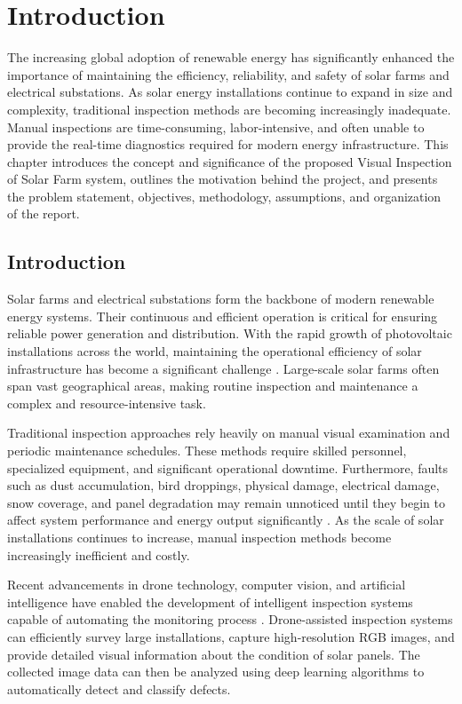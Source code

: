 \chapter{Introduction}

The increasing global adoption of renewable energy has significantly enhanced the importance of maintaining the efficiency, reliability, and safety of solar farms and electrical substations. As solar energy installations continue to expand in size and complexity, traditional inspection methods are becoming increasingly inadequate. Manual inspections are time-consuming, labor-intensive, and often unable to provide the real-time diagnostics required for modern energy infrastructure. This chapter introduces the concept and significance of the proposed Visual Inspection of Solar Farm system, outlines the motivation behind the project, and presents the problem statement, objectives, methodology, assumptions, and organization of the report.

\section{Introduction}

Solar farms and electrical substations form the backbone of modern renewable energy systems. Their continuous and efficient operation is critical for ensuring reliable power generation and distribution. With the rapid growth of photovoltaic installations across the world, maintaining the operational efficiency of solar infrastructure has become a significant challenge \cite{ref1,ref2}. Large-scale solar farms often span vast geographical areas, making routine inspection and maintenance a complex and resource-intensive task.

Traditional inspection approaches rely heavily on manual visual examination and periodic maintenance schedules. These methods require skilled personnel, specialized equipment, and significant operational downtime. Furthermore, faults such as dust accumulation, bird droppings, physical damage, electrical damage, snow coverage, and panel degradation may remain unnoticed until they begin to affect system performance and energy output significantly \cite{ref3,ref4}. As the scale of solar installations continues to increase, manual inspection methods become increasingly inefficient and costly.

Recent advancements in drone technology, computer vision, and artificial intelligence have enabled the development of intelligent inspection systems capable of automating the monitoring process \cite{ref5,ref6,ref7}. Drone-assisted inspection systems can efficiently survey large installations, capture high-resolution RGB images, and provide detailed visual information about the condition of solar panels. The collected image data can then be analyzed using deep learning algorithms to automatically detect and classify defects.


